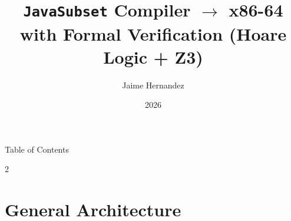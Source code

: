 \documentclass[aspectratio=169,11pt]{beamer}
\title[\texttt{JavaSubset} Compiler $\to$ x86-64]{%
  \texttt{JavaSubset} Compiler $\rightarrow$ x86-64\\[0.3em]
  {\large with Formal Verification (Hoare Logic + Z3)}}
\subtitle{}
\author{Jaime Hernandez}
\institute{Compiler Design}
\date{2026}
\begin{document}
\begin{frame}[plain]
  \titlepage
\end{frame}

\begin{frame}{Table of Contents}
  \begin{multicols}{2}
    \tableofcontents
  \end{multicols}
\end{frame}

\section{General Architecture}
\end{document}
